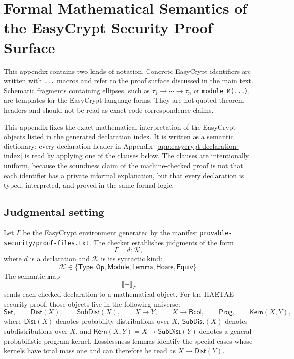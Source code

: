 \chapter{Formal Mathematical Semantics of the EasyCrypt Security Proof Surface}
\label{app:formal-easycrypt-semantics}

\providecommand{\ecfile}[1]{\nolinkurl{#1}}
\providecommand{\ecsym}[1]{\nolinkurl{#1}}
\newcommand{\ECsem}[1]{\llbracket #1 \rrbracket}
\newcommand{\Set}{\mathsf{Set}}
\newcommand{\Dist}{\mathsf{Dist}}
\newcommand{\SubDist}{\mathsf{SubDist}}
\newcommand{\Bool}{\mathsf{Bool}}
\newcommand{\ECState}{\mathsf{State}}
\newcommand{\Prog}{\mathsf{Prog}}
\newcommand{\Kern}{\mathsf{Kern}}

This appendix contains two kinds of notation.  Concrete EasyCrypt identifiers
are written with \ecsym{...} macros and refer to the proof surface discussed in
the main text.  Schematic fragments containing ellipses, such as
\(\tau_1\to\cdots\to\tau_n\) or \ecsym{module M(...)}, are templates for the
EasyCrypt language forms.  They are not quoted theorem headers and should not be
read as exact code correspondence claims.

This appendix fixes the exact mathematical interpretation of the EasyCrypt
objects listed in the generated declaration index.  It is written as a semantic
dictionary: every declaration header in Appendix~\ref{app:easycrypt-declaration-index}
is read by applying one of the clauses below.  The clauses are intentionally
uniform, because the soundness claim of the machine-checked proof is not that
each identifier has a private informal explanation, but that every declaration
is typed, interpreted, and proved in the same formal logic.

\section{Judgmental setting}
\label{app:semantic-judgmental-setting}

Let \(\Gamma\) be the EasyCrypt environment generated by the manifest
\ecfile{provable-security/proof-files.txt}.  The checker establishes judgments
of the form
\[
  \Gamma \vdash d : \mathcal{K},
\]
where \(d\) is a declaration and \(\mathcal{K}\) is its syntactic kind:
\[
  \mathcal{K}\in
  \{\mathsf{Type},\mathsf{Op},\mathsf{Module},\mathsf{Lemma},
    \mathsf{Hoare},\mathsf{Equiv}\}.
\]
The semantic map
\[
  \ECsem{-}_{\Gamma}
\]
sends each checked declaration to a mathematical object.  For the HAETAE
security proof, those objects live in the following universe:
\[
  \Set,\qquad
  \Dist(X),\qquad
  \SubDist(X),\qquad
  X\to Y,\qquad
  X\to\Bool,\qquad
  \Prog,\qquad
  \Kern(X,Y),
\]
where \(\Dist(X)\) denotes probability distributions over \(X\),
\(\SubDist(X)\) denotes subdistributions over \(X\), and
\(\Kern(X,Y)=X\to\SubDist(Y)\) denotes a general probabilistic program kernel.
Losslessness lemmas identify the special cases whose kernels have total mass one
and can therefore be read as \(X\to\Dist(Y)\).

